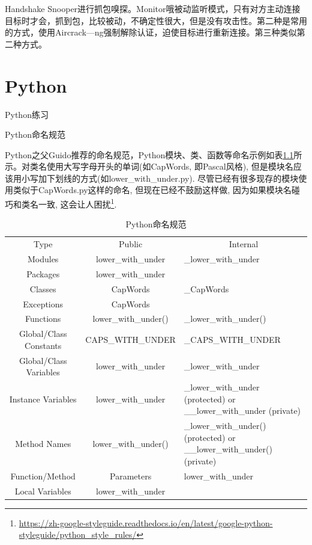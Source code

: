 \documentclass[8pt]{book}
\makeatletter
\numberwithin{dummy}{section}
\theoremstyle{ocrenumbox}
\theoremstyle{blacknumex}
\theoremstyle{blacknumbox}
\theoremstyle{ocrenum}
\renewcommand{\section}{\@startsection{section}{1}{\z@}
	{-4ex \@plus -1ex \@minus -.4ex}
	{1ex \@plus.2ex }
	{\normalfont\large\sffamily\bfseries}}
\renewcommand{\subsection}{\@startsection {subsection}{2}{\z@}
	{-3ex \@plus -0.1ex \@minus -.4ex}
	{0.5ex \@plus.2ex }
	{\normalfont\sffamily\bfseries}}
\makeatother
\begin{document}
Handshake Snooper进行抓包嗅探。Monitor哦被动监听模式，只有对方主动连接目标时才会，抓到包，比较被动，不确定性很大，但是没有攻击性。第二种是常用的方式，使用Aircrack—ng强制解除认证，迫使目标进行重新连接。第三种类似第二种方式。

\chapter{Python}

\section{Python练习}

\subsection{Python命名规范}

Python之父Guido推荐的命名规范，Python模块、类、函数等命名示例如表\ref{table:pythonnamingspecification}所示。对类名使用大写字母开头的单词(如CapWords, 即Pascal风格), 但是模块名应该用小写加下划线的方式(如lower\_with\_under.py). 尽管已经有很多现存的模块使用类似于CapWords.py这样的命名, 但现在已经不鼓励这样做, 因为如果模块名碰巧和类名一致, 这会让人困扰\footnote{\url{https://zh-google-styleguide.readthedocs.io/en/latest/google-python-styleguide/python_style_rules/}}.


\begin{table}[htbp]
	\caption{Python命名规范}
	\label{table:pythonnamingspecification}
	\begin{center}
		\begin{tabular}{|c|c|p{5cm}|}
			\hline
			\multirow{1}{*}{Type}
			& \multicolumn{1}{c|}{Public} 
			& \multicolumn{1}{c|}{Internal}\\			
			\cline{1-3}
			Modules &  lower\_with\_under	  & \_lower\_with\_under \\
			\hline
			Packages & lower\_with\_under &   \\
			\hline
			Classes & CapWords & \_CapWords \\
			\hline
			Exceptions & CapWords & \\
			\hline
			Functions &	lower\_with\_under() &	\_lower\_with\_under()\\
			\hline 
			Global/Class Constants &	CAPS\_WITH\_UNDER &\_CAPS\_WITH\_UNDER\\
			\hline
			Global/Class Variables &	lower\_with\_under &	\_lower\_with\_under\\
			\hline
			Instance Variables &	lower\_with\_under &	\_lower\_with\_under (protected) or \_\_lower\_with\_under (private)\\
			\hline
			Method Names &	lower\_with\_under() &	\_lower\_with\_under() (protected) or \_\_lower\_with\_under() (private)\\
			\hline
			Function/Method & Parameters &	lower\_with\_under\\
			\hline	 
			Local Variables &	lower\_with\_under	& \\
			\hline							
		\end{tabular}	
	\end{center}
\end{table}
\end{document}
